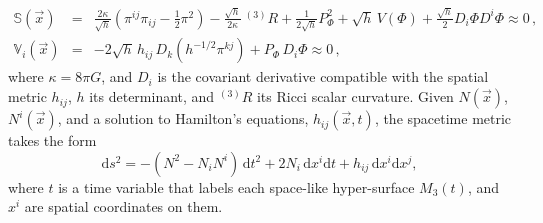 \documentclass[11pt,tightenlines,eqsecnum,floats,aps,amsmath,amssymb,nofootinbib,prd,floatfix]{revtex4}
\def\f{\frac}
\def\d{\textrm{d}}
\def\l{\left}
\def\r{\right}
\newcommand{\bea}{\nopagebreak[3]\begin{eqnarray}}
\newcommand{\ea}{\end{eqnarray}}
\newcommand{\<}{\langle}
\renewcommand{\>}{\rangle}
\begin{document}
\bea \label{scons} \mathbb S (\vec{x})&=&\f{2\kappa}{\sqrt{h}}\l( \pi^{ij}\pi_{ij} -\f{1}{2}\pi^2 \r) - \f{\sqrt{h}}{2\kappa} ~^{(3)}R + \f{1}{2\sqrt{h}} P_{\Phi}^2 + \sqrt{h} \, V(\Phi) + \f{\sqrt{h}}{2} D_i \Phi D^i \Phi \approx 0 \, ,  \\ \label{vcons}
\mathbb V_i(\vec{x})&=&  -2 \sqrt{h}\,  h_{ij} \, D_k(h^{-1/2} \pi^{kj}) +P_{\Phi} \, D_i \Phi \approx 0\, , \ea
where $\kappa=8\pi G$, and $D_i$ is the covariant derivative compatible with the spatial metric $h_{ij}$, $h$ its determinant, and $^{(3)}R$ its Ricci scalar curvature. Given $N(\vec{x})$, $N^i(\vec{x})$, and a solution to Hamilton's equations, $h_{ij}(\vec{x},t)$, the spacetime metric takes the form 
\begin{equation}
 \d s^2 = -(N^2 - N_iN^i)\,  \d t^2 + 2 N_i \, \d x^i \d t + h_{ij}\,  \d x^i \d x^j,
\end{equation}
where $t$ is a time variable that labels each space-like hyper-surface $M_3(t)$, and $x^i$ are spatial coordinates on them. 
\end{document}
